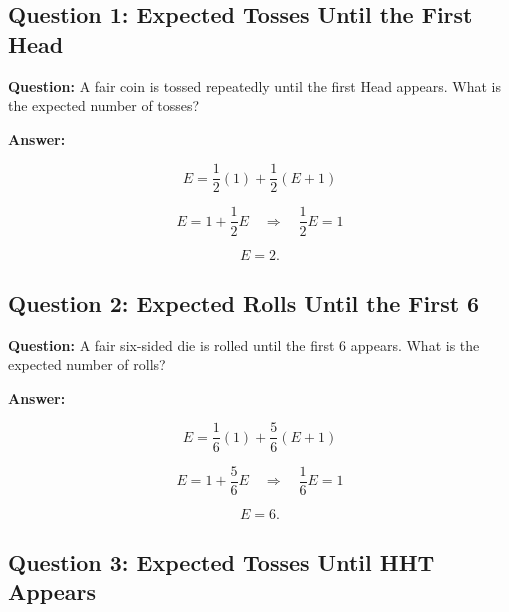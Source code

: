 \documentclass{article}
\begin{document}
\subsection*{Question 1: Expected Tosses Until the First Head}

\textbf{Question:}
A fair coin is tossed repeatedly until the first Head appears. What is the expected number of tosses?

\begin{center}
\end{center}

\textbf{Answer:}

\[
E=\frac12(1)+\frac12(E+1)
\]

\[
E=1+\frac12E
\quad\Longrightarrow\quad
\frac12E=1
\]

\[
\boxed{E=2}.
\]

\subsection*{Question 2: Expected Rolls Until the First 6}

\textbf{Question:}
A fair six-sided die is rolled until the first 6 appears. What is the expected number of rolls?

\begin{center}
\end{center}

\textbf{Answer:}

\[
E=\frac16(1)+\frac56(E+1)
\]

\[
E=1+\frac56E
\quad\Longrightarrow\quad
\frac16E=1
\]

\[
\boxed{E=6}.
\]

\subsection*{Question 3: Expected Tosses Until HHT Appears}
\end{document}
